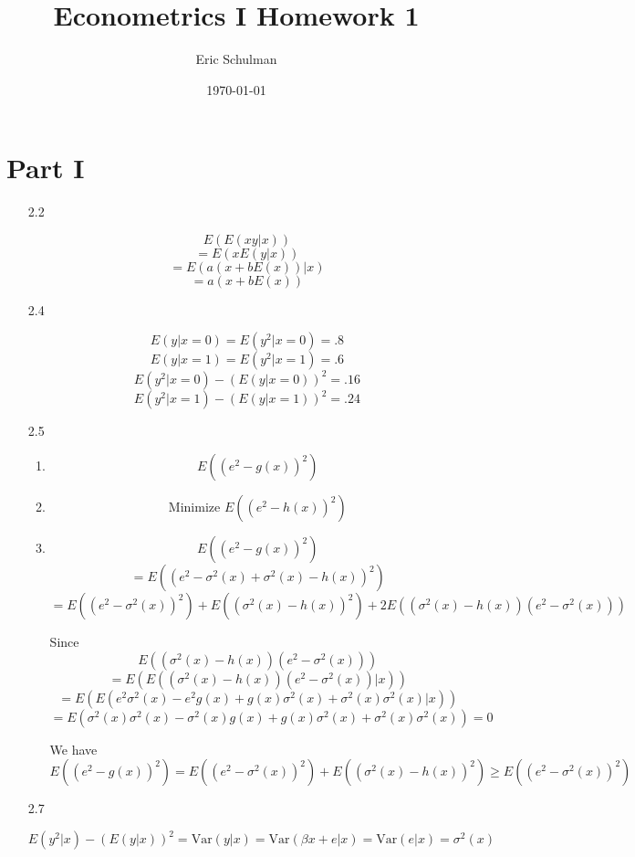 \documentclass{article}
\title{Econometrics I Homework 1}
\author{Eric Schulman}
\date{\today}
\begin{document}
\maketitle

\section{Part I}

\begin{enumerate}
	\item[2.2] 

	$$E( E(xy | x))$$
	$$ = E( xE(y | x))$$
	$$ = E(a(x+bE(x))|x)$$
	$$= a(x+bE(x))$$
	
	\item[2.4]

	$$E(y|x=0) = E(y^2 |x=0)  = .8$$
	$$E(y|x=1) = E(y^2 |x=1)  = .6$$
	$$E(y^2|x=0) - (E(y|x=0))^2 = .16$$
	$$E(y^2|x=1) - (E(y|x=1))^2 = .24$$

	\item[2.5]
	\begin{enumerate} [label=\alph*)]
    	\item 

    	$$E((e^2-g(x))^2)$$
        
        \item 

        $$\text{Minimize } E((e^2-h(x))^2)$$
        
        \item 

        $$E((e^2-g(x))^2)$$
        $$ = E((e^2-\sigma^2(x) + \sigma^2(x) - h(x))^2)$$
        $$ = E((e^2-\sigma^2(x))^2) + E((\sigma^2(x) -h(x))^2) + 2E((\sigma^2(x) -h(x))(e^2-\sigma^2(x)))$$

        Since $$E((\sigma^2(x) -h(x))(e^2-\sigma^2(x)))$$
        $$ = E(E((\sigma^2(x) -h(x))(e^2-\sigma^2(x))|x))$$
        $$ = E(E(e^2\sigma^2(x) - e^2g(x) + g(x)\sigma^2(x) +\sigma^2(x) \sigma^2(x)|x))$$
        $$ = E(\sigma^2(x)\sigma^2(x) - \sigma^2(x)g(x) + g(x)\sigma^2(x) +\sigma^2(x) \sigma^2(x)) = 0$$

        We have
        $$E((e^2-g(x))^2) = E((e^2-\sigma^2(x))^2) + E((\sigma^2(x) -h(x))^2) \geq E((e^2-\sigma^2(x))^2) $$
    
    \end{enumerate} 

    \item[2.7]

    $$E(y^2|x) - (E(y|x))^2 = \text{Var}(y|x) = \text{Var}(\beta x + e |x) = \text{Var}(e|x) = \sigma^2(x)$$


\end{enumerate}
\end{document}
